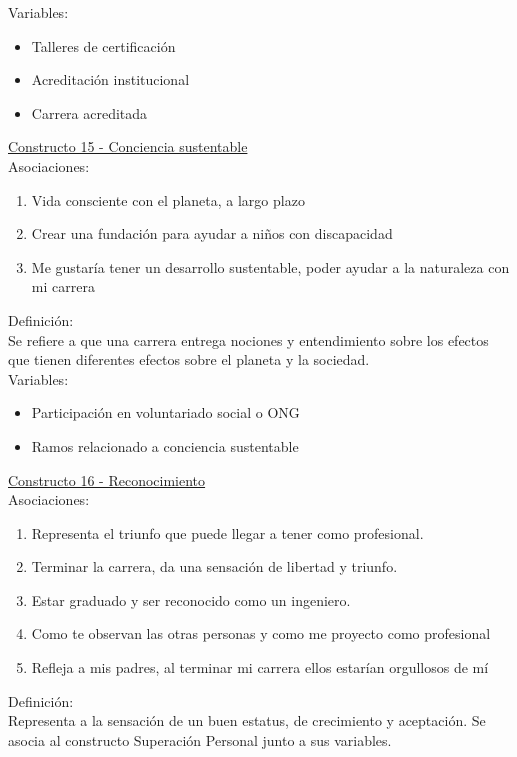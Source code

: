 Variables:
\begin{itemize}
	\item Talleres de certificación
	\item Acreditación institucional
	\item Carrera acreditada	
\end{itemize}


\underline {Constructo 15 - Conciencia sustentable} \\
Asociaciones:
\begin{enumerate}
	\item Vida consciente con el planeta, a largo plazo
	\item Crear una fundación para ayudar a niños con discapacidad	
	\item Me gustaría tener un desarrollo sustentable, poder ayudar a la naturaleza con mi carrera
\end{enumerate}

Definición:\\
Se refiere a que una carrera entrega nociones y entendimiento sobre los efectos que tienen diferentes efectos sobre el planeta y la sociedad.\\  

Variables:
\begin{itemize}
	\item Participación en voluntariado social o ONG
	\item Ramos relacionado a conciencia sustentable	
\end{itemize} 

\underline {Constructo 16 - Reconocimiento} \\
Asociaciones:
\begin{enumerate}
	\item Representa el triunfo que puede llegar a tener como profesional.
	\item Terminar la carrera, da una sensación de libertad y triunfo. 
	\item Estar graduado y ser reconocido como un ingeniero.
	\item Como te observan las otras personas y como me proyecto como profesional	
	\item Refleja a mis padres, al terminar mi carrera ellos estarían orgullosos de mí
\end{enumerate}

Definición:\\
Representa a la sensación de un buen estatus, de crecimiento y aceptación. Se asocia al constructo Superación Personal junto a sus variables.\\

